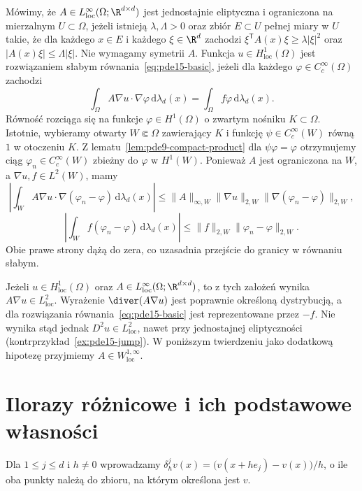 \begin{definicja}
\label{def:pde15-elliptic}
Mówimy, że $A\in L^\infty_{\mathrm{loc}}(\Omega;\R^{d\times d})$
jest jednostajnie eliptyczna i ograniczona na mierzalnym
$U\subset\Omega$, jeżeli istnieją $\lambda,\Lambda>0$
oraz zbiór $E\subset U$ pełnej miary w $U$ takie, że
dla każdego $x\in E$ i każdego $\xi\in\R^d$ zachodzi
$\xi^{\mathsf T}A(x)\xi\ge\lambda|\xi|^2$ oraz
$|A(x)\xi|\le\Lambda|\xi|$. Nie wymagamy symetrii $A$.
Funkcja $u\in H^1_{\mathrm{loc}}(\Omega)$ jest rozwiązaniem słabym
równania~\eqref{eq:pde15-basic}, jeżeli dla każdego
$\varphi\in C_c^\infty(\Omega)$ zachodzi
\[
 \int_\Omega A\nabla u\cdot\nabla\varphi\,\mathrm d\lambda_d(x)
 =\int_\Omega f\varphi\,\mathrm d\lambda_d(x).
\]
Równość rozciąga się na funkcje $\varphi\in H^1(\Omega)$
o zwartym nośniku $K\subset\Omega$. Istotnie, wybieramy
otwarty $W\Subset\Omega$ zawierający $K$ i funkcję
$\psi\in C_c^\infty(W)$ równą $1$ w otoczeniu $K$.
Z lematu~\ref{lem:pde9-compact-product} dla $\psi\varphi=\varphi$
otrzymujemy ciąg $\varphi_n\in C_c^\infty(W)$ zbieżny do
$\varphi$ w $H^1(W)$. Ponieważ $A$ jest ograniczona na $W$,
a $\nabla u,f\in L^2(W)$, mamy
\[
 \left|\int_W A\nabla u\cdot\nabla(\varphi_n-\varphi)\,
 \mathrm d\lambda_d(x)\right|
 \le \|A\|_{\infty,W}\|\nabla u\|_{2,W}
       \|\nabla(\varphi_n-\varphi)\|_{2,W},
\]
\[
 \left|\int_W f(\varphi_n-\varphi)\,\mathrm d\lambda_d(x)\right|
 \le \|f\|_{2,W}\|\varphi_n-\varphi\|_{2,W}.
\]
Obie prawe strony dążą do zera, co uzasadnia przejście
do granicy w równaniu słabym.
\end{definicja}

\begin{uwaga}
Jeżeli $u\in H^1_{\mathrm{loc}}(\Omega)$ oraz
$A\in L^\infty_{\mathrm{loc}}(\Omega;\R^{d\times d})$,
to z tych założeń wynika $A\nabla u\in L^2_{\mathrm{loc}}$.
Wyrażenie $\diver(A\nabla u)$ jest poprawnie określoną
dystrybucją, a dla rozwiązania równania~\eqref{eq:pde15-basic}
jest reprezentowane przez $-f$. Nie wynika stąd jednak
$D^2u\in L^2_{\mathrm{loc}}$, nawet przy jednostajnej
eliptyczności (kontrprzykład~\ref{ex:pde15-jump}).
W poniższym twierdzeniu jako dodatkową hipotezę
przyjmiemy $A\in W^{1,\infty}_{\mathrm{loc}}$.
\end{uwaga}

\section{Ilorazy różnicowe i ich podstawowe własności}
\label{sec:pde15-differences}
Dla $1\le j\le d$ i $h\ne0$ wprowadzamy
$\delta_h^jv(x)=\bigl(v(x+he_j)-v(x)\bigr)/h$, o ile oba punkty
należą do zbioru, na którym określona jest $v$.

